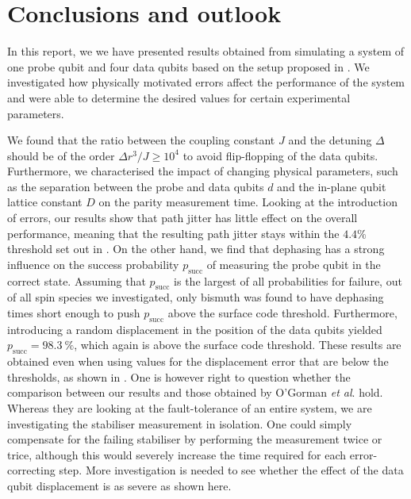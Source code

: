 
\section{Conclusions and outlook } \label{sec:conclusions}
In this report, we we have presented results obtained from simulating a system of one probe qubit and four data qubits based on the setup proposed in \cite{OGorman2016}. We investigated how physically motivated errors affect the performance of the system and were able to determine the desired values for certain experimental parameters. 

We found that the ratio between the coupling constant $J$ and the detuning $\Delta$ should be of the order $\Delta r^3/J \ge 10^4$ to avoid flip-flopping of the data qubits. Furthermore, we characterised the impact of changing physical parameters, such as the separation between the probe and data qubits $d$ and the in-plane qubit lattice constant $D$ on the parity measurement time.  
Looking at the introduction of errors, our results show that path jitter has little effect on the overall performance, meaning that the resulting path jitter stays within the $4.4\%$ threshold set out in \cite{OGorman2016}. On the other hand, we find that dephasing has a strong influence on the success probability $p_{\textrm{succ}}$ of measuring the probe qubit in the correct state. Assuming that $p_{\textrm{succ}}$ is the largest of all probabilities for failure, out of all spin species we investigated, only bismuth was found to have dephasing times short enough to push $p_{\textrm{succ}}$ above the surface code threshold. Furthermore, introducing a random displacement in the position of the data qubits yielded $p_{\textrm{succ}} = \SI{98.3}{\percent}$, which  again is above the surface code threshold. These results are obtained even when using values for the displacement error that are below the thresholds, as shown in \cite{OGorman2016}. One is however right to question whether the comparison between our results and those obtained by O'Gorman \textit{et al}. hold. Whereas they are looking at the fault-tolerance of an entire system, we are investigating the stabiliser measurement in isolation. One could simply compensate for the failing stabiliser by performing the measurement twice or trice, although this would severely increase the time required for each error-correcting step. More investigation is needed to see whether the effect of the data qubit displacement is as severe as shown here. 




